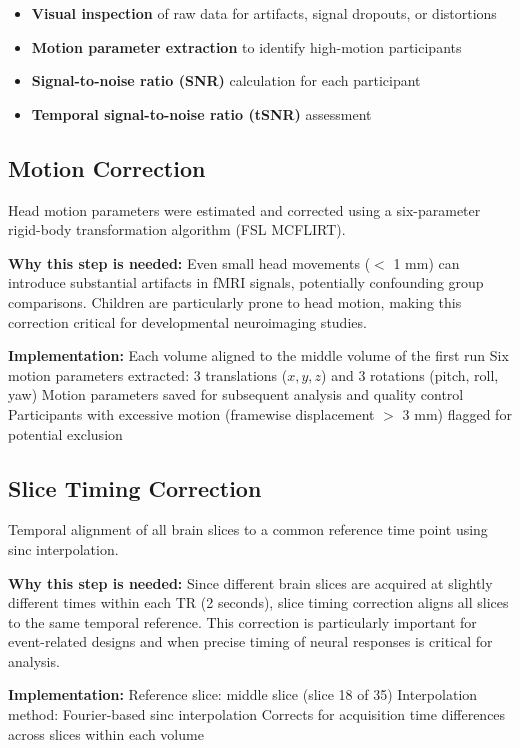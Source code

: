 \documentclass[12pt, a4paper]{article}
\begin{document}
\begin{itemize}
\item \textbf{Visual inspection} of raw data for artifacts, signal dropouts, or distortions
\item \textbf{Motion parameter extraction} to identify high-motion participants
\item \textbf{Signal-to-noise ratio (SNR)} calculation for each participant
\item \textbf{Temporal signal-to-noise ratio (tSNR)} assessment
\end{itemize}


\subsection{Motion Correction}
Head motion parameters were estimated and corrected using a six-parameter rigid-body transformation algorithm (FSL MCFLIRT).

\noindent
\textbf{Why this step is needed:} Even small head movements ($<$ 1 mm) can introduce substantial artifacts in fMRI signals, potentially confounding group comparisons. Children are particularly prone to head motion, making this correction critical for developmental neuroimaging studies.

\noindent
\textbf{Implementation:} Each volume aligned to the middle volume of the first run
Six motion parameters extracted: 3 translations ($x, y, z$) and 3 rotations (pitch, roll, yaw)
Motion parameters saved for subsequent analysis and quality control
Participants with excessive motion (framewise displacement $>$ 3 mm) flagged for potential exclusion


\subsection{Slice Timing Correction}
Temporal alignment of all brain slices to a common reference time point using sinc interpolation.

\noindent
\textbf{Why this step is needed:} Since different brain slices are acquired at slightly different times within each TR (2 seconds), slice timing correction aligns all slices to the same temporal reference. This correction is particularly important for event-related designs and when precise timing of neural responses is critical for analysis.

\noindent
\textbf{Implementation:} Reference slice: middle slice (slice 18 of 35)
Interpolation method: Fourier-based sinc interpolation
Corrects for acquisition time differences across slices within each volume
\end{document}
